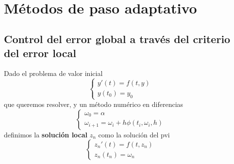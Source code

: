 \section{Métodos de paso adaptativo}
\subsection{Control del error global a través del criterio del error local}
\begin{definition}
Dado el problema de valor inicial 
$$
\left\{
\begin{array}{lll}
y'(t) = f(t,y) & & \\
y(t_0) = y_0 & &
\end{array}
\right.
$$
 que queremos resolver, y un método numérico en diferencias
\begin{equation}
\label{eq6}
\left\{
\begin{array}{lll}
\omega_0 = \alpha & & \\
\omega_{i+1} = \omega_i + h \phi(t_i, \omega_i, h) & & 
\end{array}
\right.
\end{equation}
definimos la \textbf{solución local} $z_n$ como la solución del pvi
$$
\left\{
\begin{array}{lll}
z_n'(t) = f(t,z_n) & & \\
z_n(t_n) = \omega_n & &
\end{array}
\right.
$$
\end{definition}


